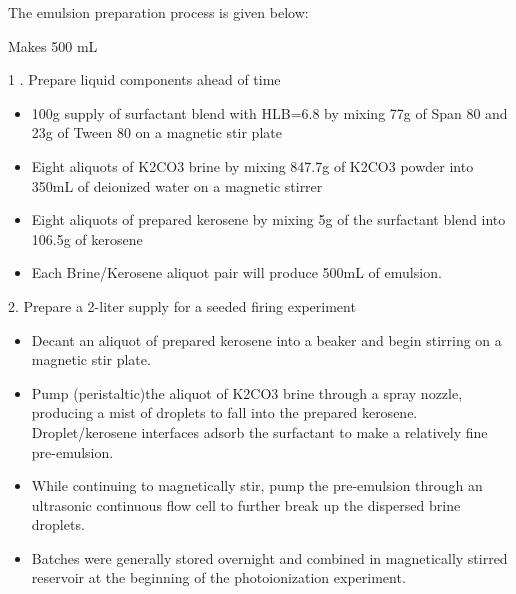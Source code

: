 The emulsion preparation process is given below:

Makes 500 mL 

1 . Prepare liquid components ahead of time 
\begin{itemize}
\item 100g supply of surfactant blend with HLB=6.8 by mixing 77g of Span 80 and 23g of Tween 80 on a magnetic stir plate 

\item Eight aliquots of K2CO3 brine by mixing 847.7g of K2CO3 powder into 350mL of deionized water on a magnetic stirrer 

\item Eight aliquots of prepared kerosene by mixing 5g of the surfactant blend into 106.5g of kerosene  

\item Each Brine/Kerosene aliquot pair will produce 500mL of emulsion. 
\end{itemize}


2. Prepare a 2-liter supply for a seeded firing experiment 

\begin{itemize}
    
\item Decant an aliquot of prepared kerosene into a beaker and begin stirring on a magnetic stir plate. 

\item Pump (peristaltic)the aliquot of K2CO3 brine through a spray nozzle, producing a mist of droplets to fall into the prepared kerosene. Droplet/kerosene interfaces adsorb the surfactant to make a relatively fine pre-emulsion. 

\item While continuing to magnetically stir, pump the pre-emulsion through an ultrasonic continuous flow cell to further break up the dispersed brine droplets. 

\item Batches were generally stored overnight and combined in magnetically stirred reservoir at the beginning of the photoionization experiment. 
\end{itemize}
